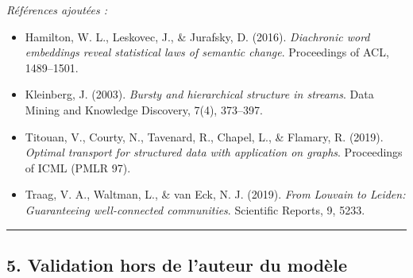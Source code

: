 \documentclass[a4paper,11pt]{article}
\providecommand{\tightlist}{\setlength{\itemsep}{0pt}\setlength{\parskip}{0pt}}
\begin{document}
\emph{Références ajoutées :}

\begin{itemize}
\tightlist
\item
  Hamilton, W. L., Leskovec, J., \& Jurafsky, D. (2016).
  \emph{Diachronic word embeddings reveal statistical laws of semantic
  change}. Proceedings of ACL, 1489--1501.
\item
  Kleinberg, J. (2003). \emph{Bursty and hierarchical structure in
  streams}. Data Mining and Knowledge Discovery, 7(4), 373--397.
\item
  Titouan, V., Courty, N., Tavenard, R., Chapel, L., \& Flamary, R.
  (2019). \emph{Optimal transport for structured data with application
  on graphs}. Proceedings of ICML (PMLR 97).
\item
  Traag, V. A., Waltman, L., \& van Eck, N. J. (2019). \emph{From
  Louvain to Leiden: Guaranteeing well-connected communities}.
  Scientific Reports, 9, 5233.
\end{itemize}

\begin{center}\rule{0.5\linewidth}{0.5pt}\end{center}

\subsection*{5. Validation hors de l'auteur du modèle}
\end{document}
